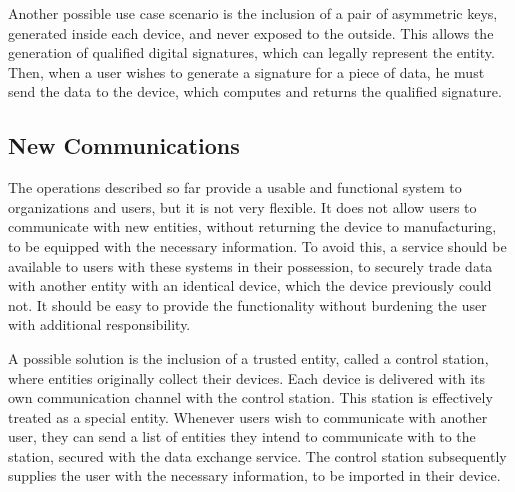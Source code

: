 Another possible use case scenario is the inclusion of a pair of asymmetric keys, generated inside each device, and never exposed to the outside. This allows the generation of qualified digital signatures, which can legally represent the entity.
Then, when a user wishes to generate a signature for a piece of data, he must send the data to the device, which computes and returns the qualified signature.


\subsection{New Communications}\label{chap:problem:scenarios:keys}

The operations described so far provide a usable and functional system to organizations and users, but it is not very flexible. It does not allow users to communicate with new entities, without returning the device to manufacturing, to be equipped with the necessary information.
To avoid this, a service should be available to users with these systems in their possession, to securely trade data with another entity with an identical device, which the device previously could not. It should be easy to provide the functionality without burdening the user with additional responsibility.

A possible solution is the inclusion of a trusted entity, called a control station, where entities originally collect their devices. Each device is delivered with its own communication channel with the control station. This station is effectively treated as a special entity.
Whenever users wish to communicate with another user, they can send a list of entities they intend to communicate with to the station, secured with the data exchange service. The control station subsequently supplies the user with the necessary information, to be imported in their device.

